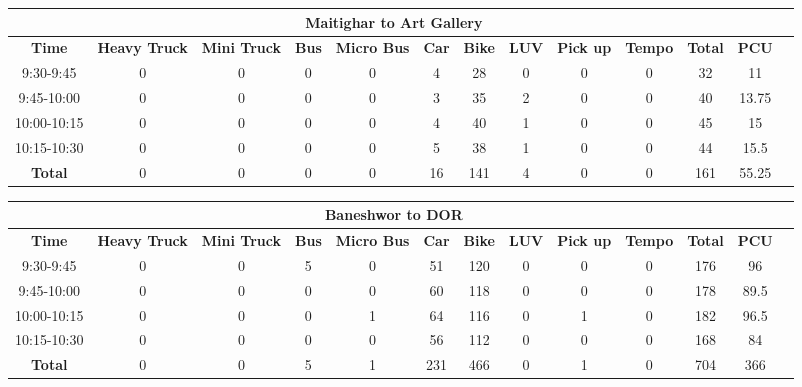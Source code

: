 \begin{landscape}
\centering
\begin{table}[h!]
\centering
\begin{tabular}{|c|c|c|c|c|c|c|c|c|c|c|c|c|}
    \hline
    \multicolumn{12}{|c|}{\textbf{Maitighar to Art Gallery}} \\
    \hline
    \textbf{Time} & \textbf{Heavy Truck} & \textbf{Mini Truck} & \textbf{Bus} & \textbf{Micro Bus} & \textbf{Car} & \textbf{Bike} & \textbf{LUV} & \textbf{Pick up} & \textbf{Tempo} & \textbf{\textbf{Total}} & \textbf{PCU} \\
    \hline
    9:30-9:45	&0	&0	&0	&0	&4	&28	&0	&0	&0	&32	&11 \\ \hline
    9:45-10:00	&0	&0	&0	&0	&3	&35	&2	&0	&0	&40	&13.75 \\ \hline
    10:00-10:15	&0	&0	&0	&0	&4	&40	&1	&0	&0	&45	&15 \\ \hline
    10:15-10:30	&0	&0	&0	&0	&5	&38	&1	&0	&0	&44	&15.5 \\ \hline
    \textbf{Total} & 0 & 0 & 0 & 0 & 16 & 141 & 4 & 0 & 0 & 161 & 55.25 \\ \hline
\end{tabular}

\vspace{0.5cm}

\begin{tabular}{|c|c|c|c|c|c|c|c|c|c|c|c|c|}
        \hline
        \multicolumn{12}{|c|}{\textbf{Baneshwor to DOR}} \\
        \hline
        \textbf{Time} & \textbf{Heavy Truck} & \textbf{Mini Truck} & \textbf{Bus} & \textbf{Micro Bus} & \textbf{Car} & \textbf{Bike} & \textbf{LUV} & \textbf{Pick up} & \textbf{Tempo} & \textbf{\textbf{Total}} & \textbf{PCU} \\
        \hline
        9:30-9:45	&0	&0	&5	&0	&51	&120	&0	&0	&0	&176	&96 \\ \hline
        9:45-10:00	&0	&0	&0	&0	&60	&118	&0	&0	&0	&178	&89.5 \\ \hline
        10:00-10:15	&0	&0	&0	&1	&64	&116	&0	&1	&0	&182	&96.5 \\ \hline
        10:15-10:30	&0	&0	&0	&0	&56	&112	&0	&0	&0	&168	&84 \\ \hline
        \textbf{Total}	    &0	&0	&5	&1	&231	&466	&0	&1 &0  &704 &366 \\
        \hline
\end{tabular}
\end{table}
\end{landscape}

